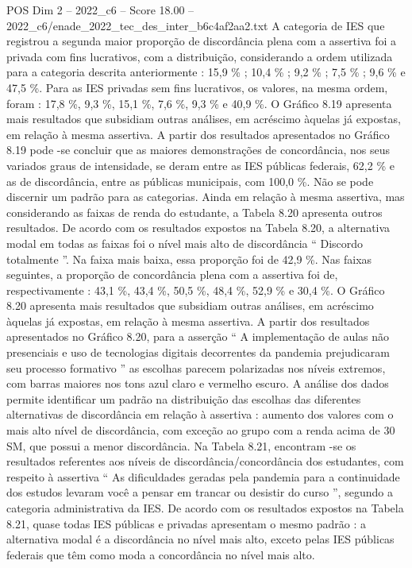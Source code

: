 \begin{textsample}{POS Dim 2 – 2022\_c6 – Score 18.00 – 2022\_c6/enade\_2022\_tec\_des\_inter\_b6c4af2aa2.txt}
A categoria de IES que registrou a segunda maior proporção de discordância plena com a assertiva foi a privada com fins lucrativos, com a distribuição, considerando a ordem utilizada para a categoria descrita anteriormente : 15,9 \% ; 10,4 \% ; 9,2 \% ; 7,5 \% ; 9,6 \% e 47,5 \%.
Para as IES privadas sem fins lucrativos, os valores, na mesma ordem, foram : 17,8 \%, 9,3 \%, 15,1 \%, 7,6 \%, 9,3 \% e 40,9 \%.
O Gráfico 8.19 apresenta mais resultados que subsidiam outras análises, em acréscimo àquelas já expostas, em relação à mesma assertiva.
A partir dos resultados apresentados no Gráfico 8.19 pode -se concluir que as maiores demonstrações de concordância, nos seus variados graus de intensidade, se deram entre as IES públicas federais, 62,2 \% e as de discordância, entre as públicas municipais, com 100,0 \%.
Não se pode discernir um padrão para as categorias.
Ainda em relação à mesma assertiva, mas considerando as faixas de renda do estudante, a Tabela 8.20 apresenta outros resultados.
De acordo com os resultados expostos na Tabela 8.20, a alternativa modal em todas as faixas foi o nível mais alto de discordância “ Discordo totalmente ”.
Na faixa mais baixa, essa proporção foi de 42,9 \%.
Nas faixas seguintes, a proporção de concordância plena com a assertiva foi de, respectivamente : 43,1 \%, 43,4 \%, 50,5 \%, 48,4 \%, 52,9 \% e 30,4 \%.
O Gráfico 8.20 apresenta mais resultados que subsidiam outras análises, em acréscimo àquelas já expostas, em relação à mesma assertiva.
A partir dos resultados apresentados no Gráfico 8.20, para a asserção “ A implementação de aulas não presenciais e uso de tecnologias digitais decorrentes da pandemia prejudicaram seu processo formativo ” as escolhas parecem polarizadas nos níveis extremos, com barras maiores nos tons azul claro e vermelho escuro.
A análise dos dados permite identificar um padrão na distribuição das escolhas das diferentes alternativas de discordância em relação à assertiva : aumento dos valores com o mais alto nível de discordância, com exceção ao grupo com a renda acima de 30 SM, que possui a menor discordância.
Na Tabela 8.21, encontram -se os resultados referentes aos níveis de discordância/concordância dos estudantes, com respeito à assertiva “ As dificuldades geradas pela pandemia para a continuidade dos estudos levaram você a pensar em trancar ou desistir do curso ”, segundo a categoria administrativa da IES.
De acordo com os resultados expostos na Tabela 8.21, quase todas IES públicas e privadas apresentam o mesmo padrão : a alternativa modal é a discordância no nível mais alto, exceto pelas IES públicas federais que têm como moda a concordância no nível mais alto.

\end{textsample}
